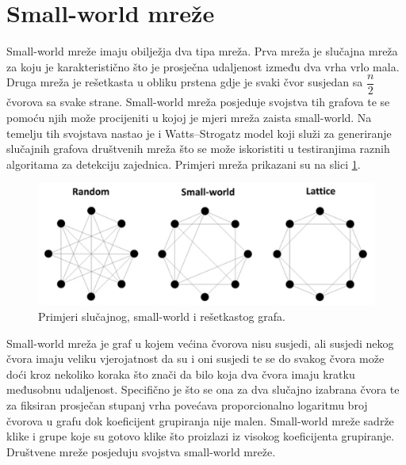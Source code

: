 \section{Small-world mreže}

Small-world mreže imaju obilježja dva tipa mreža. Prva mreža je slučajna mreža za koju je karakteristično što je prosječna udaljenost između dva vrha vrlo mala. Druga mreža je rešetkasta u obliku prstena gdje je svaki čvor susjedan sa $\dfrac{n}{2}$ čvorova sa svake strane. Small-world mreža posjeduje svojstva tih grafova te se pomoću njih može procijeniti u kojoj je mjeri mreža zaista small-world. Na temelju tih svojstava nastao je i Watts–Strogatz model koji služi za generiranje slučajnih grafova društvenih mreža što se može iskoristiti u testiranjima raznih algoritama za detekciju zajednica. Primjeri mreža prikazani su na slici \ref{fig:small-world}.

\begin{figure}
	\includegraphics[width=\linewidth]{images/small-world.png}
	\caption{Primjeri slučajnog, small-world i rešetkastog grafa.}
	\label{fig:small-world}
\end{figure}

Small-world mreža je graf u kojem većina čvorova nisu susjedi, ali susjedi nekog čvora imaju veliku vjerojatnost da su i oni susjedi te se do svakog čvora može doći kroz nekoliko koraka što znači da bilo koja dva čvora imaju kratku međusobnu udaljenost. Specifično je što se ona za dva slučajno izabrana čvora te za fiksiran prosječan stupanj vrha povećava proporcionalno logaritmu broj čvorova u grafu dok koeficijent grupiranja nije malen. Small-world mreže sadrže klike i grupe koje su gotovo klike što proizlazi iz visokog koeficijenta grupiranje. Društvene mreže posjeduju svojstva small-world mreže.

